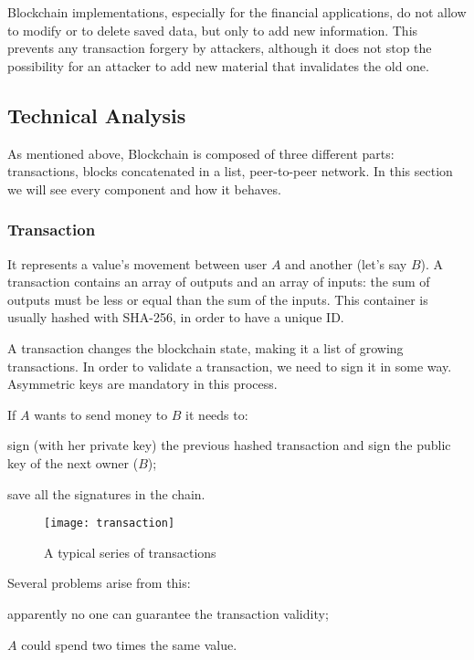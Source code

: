 Blockchain implementations, especially for the financial applications, do not
allow to modify or to delete saved data, but only to add new information. This
prevents any transaction forgery by attackers, although it does not stop the
possibility for an attacker to add new material that invalidates the old one.

\subsection{Technical Analysis}

As mentioned above, Blockchain is composed of three different
parts\cite{sok15}: transactions, blocks concatenated in a list, peer-to-peer
network. In this section we will see every component and how it behaves.

\subsubsection{Transaction}
It represents a value's movement between user $A$ and another (let's
say $B$). A transaction contains an array of outputs and an array of
inputs\cite{sok15}: the sum of outputs must be less or equal than the sum of
the inputs.
This container is usually hashed with SHA-256, in order to have a
unique ID.

A transaction changes the blockchain state, making it a list of growing
transactions.
In order to validate a transaction, we need to sign it in some way. Asymmetric
keys are mandatory in this process.

If $A$ wants to send money to $B$ it needs to:
\begin{enumerate*}[label=\roman*)]
 \item sign (with her private key) the previous hashed transaction and sign the
public key of the next owner ($B$);
 \item save all the signatures in the chain.
\end{enumerate*}

\begin{figure}[ht]
 \centering
 \texttt{[image: transaction]}
 \caption{A typical series of transactions}
\end{figure}

Several problems arise from this:
\begin{enumerate*}[label=\roman*)]
 \item apparently no one can guarantee the transaction validity;
 \item $A$ could spend two times the same value.
\end{enumerate*}

